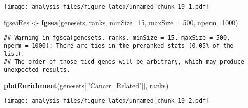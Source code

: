 \documentclass[]{article}
\newenvironment{Shaded}{\begin{snugshade}}{\end{snugshade}}
\newcommand{\DataTypeTok}[1]{\textcolor[rgb]{0.13,0.29,0.53}{#1}}
\newcommand{\DecValTok}[1]{\textcolor[rgb]{0.00,0.00,0.81}{#1}}
\newcommand{\KeywordTok}[1]{\textcolor[rgb]{0.13,0.29,0.53}{\textbf{#1}}}
\newcommand{\NormalTok}[1]{#1}
\newcommand{\OperatorTok}[1]{\textcolor[rgb]{0.81,0.36,0.00}{\textbf{#1}}}
\newcommand{\StringTok}[1]{\textcolor[rgb]{0.31,0.60,0.02}{#1}}
\begin{document}
\begin{Shaded}
\end{Shaded}

\texttt{[image: analysis\_files/figure-latex/unnamed-chunk-19-1.pdf]}

\begin{Shaded}
\begin{Highlighting}[]
\NormalTok{fgseaRes <-}\StringTok{ }\KeywordTok{fgsea}\NormalTok{(genesets, ranks, }\DataTypeTok{minSize=}\DecValTok{15}\NormalTok{, }\DataTypeTok{maxSize =} \DecValTok{500}\NormalTok{, }\DataTypeTok{nperm=}\DecValTok{1000}\NormalTok{)}
\end{Highlighting}
\end{Shaded}

\begin{verbatim}
## Warning in fgsea(genesets, ranks, minSize = 15, maxSize = 500, nperm = 1000): There are ties in the preranked stats (0.05% of the list).
## The order of those tied genes will be arbitrary, which may produce unexpected results.
\end{verbatim}

\begin{Shaded}
\begin{Highlighting}[]
\KeywordTok{plotEnrichment}\NormalTok{(genesets[[}\StringTok{"Cancer_Related"}\NormalTok{]], ranks)}
\end{Highlighting}
\end{Shaded}

\texttt{[image: analysis\_files/figure-latex/unnamed-chunk-19-2.pdf]}
\end{document}
